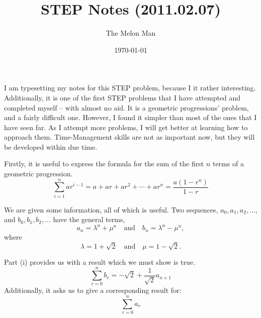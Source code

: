 \documentclass[12pt]{article}
\title{STEP Notes (2011.02.07)}
\author{The Melon Man}
\date{\today}
\begin{document}
\maketitle

I am typesetting my notes for this STEP problem, because I it rather interesting.
Additionally, it is one of the first STEP problems that I have attempted and completed myself -- with almost no aid.
It is a geometric progressions' problem, and a fairly difficult one.
However, I found it simpler than most of the ones that I have seen far.
As I attempt more problems, I will get better at learning how to approach them.
Time-Management skills are not as important now, but they will be developed within due time.

Firstly, it is useful to express the formula for the sum of the first $n$ terms of a geometric progression.
\begin{equation}
    \sum_{i=1}^n ar^{i-1} = a + ar + ar^2 + \cdots + ar^n = \frac{a(1-r^n)}{1-r} \label{Geometric Series}
\end{equation}

We are given some information, all of which is useful.
Two sequences, $a_0, a_1, a_2, \ldots$, and $b_0, b_1, b_2, \ldots$ have the general terms,
\begin{equation*}
    a_n = \lambda^n + \mu^n \quad \text{and} \quad b_n = \lambda^n - \mu^n,
\end{equation*}
where
\begin{equation*}
    \lambda = 1 + \sqrt{2} \quad \text{and} \quad \mu = 1 - \sqrt{2}.
\end{equation*}

Part (i) provides us with a result which we must show is true.
\begin{equation}
    \sum_{r=0}^{n} b_r = -\sqrt{2} + \frac{1}{\sqrt{2}} a_{n+1}
\end{equation}
Additionally, it asks us to give a corresponding result for:
\begin{equation*}
    \sum_{r=0}^{n} a_r
\end{equation*}
\end{document}
